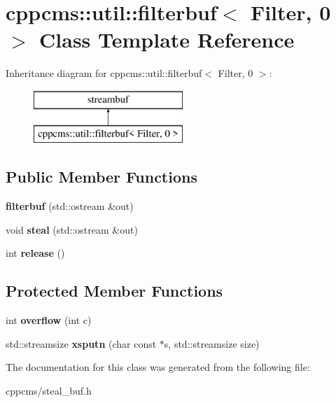 \section{cppcms\+:\+:util\+:\+:filterbuf$<$ Filter, 0 $>$ Class Template Reference}
\label{classcppcms_1_1util_1_1filterbuf_3_01Filter_00_010_01_4}
Inheritance diagram for cppcms\+:\+:util\+:\+:filterbuf$<$ Filter, 0 $>$\+:\begin{figure}[H]
\begin{center}
\leavevmode
\includegraphics[height=2.000000cm]{classcppcms_1_1util_1_1filterbuf_3_01Filter_00_010_01_4}
\end{center}
\end{figure}
\subsection*{Public Member Functions}
\begin{DoxyCompactItemize}
\item 
{\bfseries filterbuf} (std\+::ostream \&out)\label{classcppcms_1_1util_1_1filterbuf_3_01Filter_00_010_01_4_a9849d6a053c34fd1a3563b6bc14eb5fc}

\item 
void {\bfseries steal} (std\+::ostream \&out)\label{classcppcms_1_1util_1_1filterbuf_3_01Filter_00_010_01_4_aa896287263e89b3df98261710adcc46a}

\item 
int {\bfseries release} ()\label{classcppcms_1_1util_1_1filterbuf_3_01Filter_00_010_01_4_a5d34d38c71a043c80f4f86725280c530}

\end{DoxyCompactItemize}
\subsection*{Protected Member Functions}
\begin{DoxyCompactItemize}
\item 
int {\bfseries overflow} (int c)\label{classcppcms_1_1util_1_1filterbuf_3_01Filter_00_010_01_4_a0a43979f703067b82b673def30704840}

\item 
std\+::streamsize {\bfseries xsputn} (char const $\ast$s, std\+::streamsize size)\label{classcppcms_1_1util_1_1filterbuf_3_01Filter_00_010_01_4_af82e5dd40084f73e9b8229590531da9f}

\end{DoxyCompactItemize}


The documentation for this class was generated from the following file\+:\begin{DoxyCompactItemize}
\item 
cppcms/steal\+\_\+buf.\+h\end{DoxyCompactItemize}
